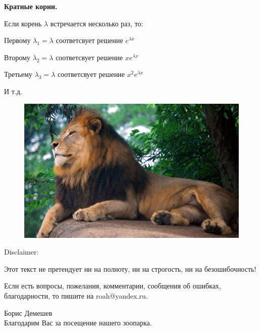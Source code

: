 \documentclass[10pt,a4paper]{article}
\begin{document}
\par \textbf{Кратные корни.}
\par Если корень $\lambda$ встречается несколько раз, то:
\par Первому $\lambda_1 = \lambda$ соответсвует решение $e^{\lambda x}$
\par Второму $\lambda_2 = \lambda$ соответсвует решение $xe^{\lambda x}$
\par Третьему $\lambda_3 = \lambda$ соответсвует решение $x^2e^{\lambda x}$
\par И т.д.
\newpage
\pagecolor{YellowOrange}
\begin{figure}[h]
\centerline{\includegraphics[width = 12cm]{king.jpg}}
\end{figure}
\par Disclaimer:
\par Этот текст не претендует ни на полноту, ни на строгость, ни на безошибочность! 
\par Если есть вопросы, пожелания, комментарии, сообщения об ошибках, благодарности, то пишите на roah@yandex.ru. 
\par Борис Демешев \\

Благодарим Вас за посещение нашего зоопарка.
\end{document}

